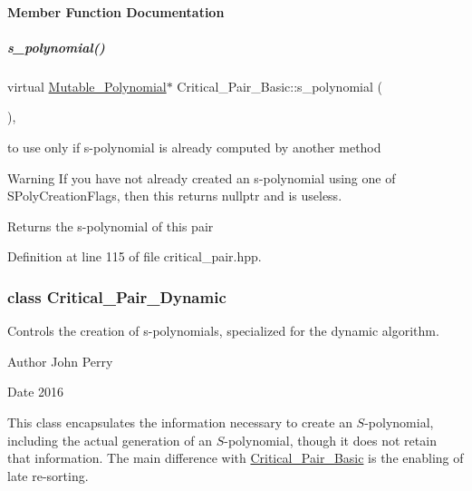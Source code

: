 \paragraph{Member Function Documentation}
\mbox{\label{group___g_b_computation_ab2dbac89b07b2acfad633a9de8f56fab}} 
\subparagraph{\texorpdfstring{s\+\_\+polynomial()}{s\_polynomial()}}
{\footnotesize\ttfamily virtual \hyperlink{group__polygroup_class_mutable___polynomial}{Mutable\+\_\+\+Polynomial}$\ast$ Critical\+\_\+\+Pair\+\_\+\+Basic\+::s\+\_\+polynomial (\begin{DoxyParamCaption}{ }\end{DoxyParamCaption})\hspace{0.3cm}{\ttfamily [inline]}, {\ttfamily [virtual]}}



to use only if s-\/polynomial is already computed by another method 

\begin{DoxyWarning}{Warning}
If you have not already created an s-\/polynomial using one of S\+Poly\+Creation\+Flags, then this returns {\ttfamily nullptr} and is useless. 
\end{DoxyWarning}
\begin{DoxyReturn}{Returns}
the s-\/polynomial of this pair 
\end{DoxyReturn}


Definition at line 115 of file critical\+\_\+pair.\+hpp.

\label{class_critical___pair___dynamic}
\subsubsection{class Critical\+\_\+\+Pair\+\_\+\+Dynamic}
Controls the creation of s-\/polynomials, specialized for the dynamic algorithm. 

\begin{DoxyAuthor}{Author}
John Perry 
\end{DoxyAuthor}
\begin{DoxyDate}{Date}
2016
\end{DoxyDate}
This class encapsulates the information necessary to create an $S$-\/polynomial, including the actual generation of an $S$-\/polynomial, though it does not retain that information. The main difference with {\ttfamily \hyperlink{group___g_b_computation_class_critical___pair___basic}{Critical\+\_\+\+Pair\+\_\+\+Basic}} is the enabling of late re-\/sorting. 

